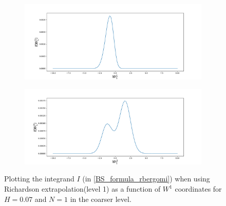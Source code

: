 \documentclass[11pt]{article}
\begin{document}
\begin{figure}[h!]
	\centering
	\begin{subfigure}{.4\textwidth}
		\centering
		\includegraphics[width=1\linewidth]{./figures/integrand_richardson_plotting_rBergomi/N_1/W_1/Bergomi_integrand_rich_level1_K_1_H_007_y1f_N_1}
		\caption{}
		\label{fig:sub3}
	\end{subfigure}%
	\begin{subfigure}{.4\textwidth}
		\centering
		\includegraphics[width=1\linewidth]{./figures/integrand_richardson_plotting_rBergomi/N_1/W_1/Bergomi_integrand_rich_level1_K_1_H_007_y2f_N_1}
		\caption{}
		\label{fig:sub4}
	\end{subfigure}
	\caption{Plotting the integrand $I$ (in \eqref{BS_formula_rbergomi}) when using Richardson extrapolation(level 1) as a function of $W^1$ coordinates for $H=0.07$ and $N=1$ in the coarser level.}
	\label{fig:Integrand_rich_level1_H_007_N_1_W_1}
\end{figure}
\end{document}
